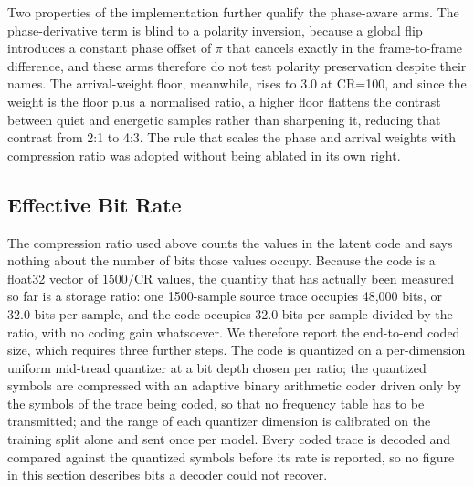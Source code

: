 \documentclass[fleqn,10pt]{wlscirep}
\begin{document}
Two properties of the implementation further qualify the phase-aware arms. The phase-derivative term is blind to a polarity inversion, because a global flip introduces a constant phase offset of $\pi$ that cancels exactly in the frame-to-frame difference, and these arms therefore do not test polarity preservation despite their names. The arrival-weight floor, meanwhile, rises to 3.0 at CR=100, and since the weight is the floor plus a normalised ratio, a higher floor flattens the contrast between quiet and energetic samples rather than sharpening it, reducing that contrast from 2:1 to 4:3. The rule that scales the phase and arrival weights with compression ratio was adopted without being ablated in its own right.

\subsection{Effective Bit Rate}
\label{subsec:bitrate}

The compression ratio used above counts the values in the latent code and says nothing about the number of bits those values occupy. Because the code is a float32 vector of $1500/\mathrm{CR}$ values, the quantity that has actually been measured so far is a storage ratio: one 1500-sample source trace occupies 48,000 bits, or 32.0 bits per sample, and the code occupies 32.0 bits per sample divided by the ratio, with no coding gain whatsoever. We therefore report the end-to-end coded size, which requires three further steps. The code is quantized on a per-dimension uniform mid-tread quantizer at a bit depth chosen per ratio; the quantized symbols are compressed with an adaptive binary arithmetic coder driven only by the symbols of the trace being coded, so that no frequency table has to be transmitted; and the range of each quantizer dimension is calibrated on the training split alone and sent once per model. Every coded trace is decoded and compared against the quantized symbols before its rate is reported, so no figure in this section describes bits a decoder could not recover.
\end{document}
